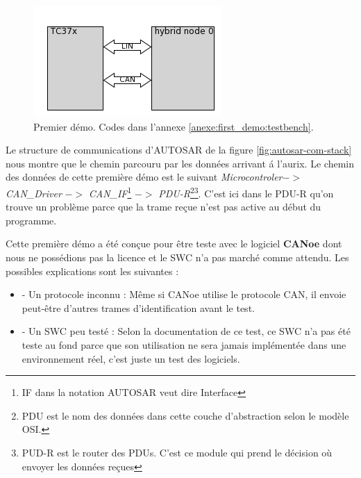 \begin{figure}[!htb] 
\centering 
\includegraphics[]{img/first_demo_testbench.png} 
\caption{Premier démo. Codes dans l'annexe \ref{anexe:first_demo:testbench}.} 
\label{fig:first-demo-diagram} 
\end{figure} 

Le structure de communications d'AUTOSAR de la figure \ref{fig:autosar-com-stack} nous montre que le chemin parcouru par les données arrivant \'a l'aurix. Le chemin des données de cette première démo est le suivant \textit{Microcontroler}$ ->$ \textit{CAN\_Driver}\cite{can_drv_man} $->$ \textit{CAN\_IF}\footnote{IF dans la notation AUTOSAR veut dire Interface}\cite{can_if_man} $->$ \textit{PDU-R}\footnote{PDU est le nom des donn\'ees dans cette couche d'abstraction selon le modèle OSI\cite{osi-model}.}\footnote{PUD-R\cite{pdu_r_man} est le router des PDUs. C'est ce module qui prend le décision o\`u envoyer les données reçues}\cite{pdu_r_man}. C'est ici dans le PDU-R qu'on trouve un problème parce que la trame reçue n'est pas active au début du programme. 

Cette première démo a été conçue pour être teste avec le logiciel \textbf{CANoe}\cite{canoe} dont nous ne possédions pas la licence et le SWC n'a pas marché comme attendu. Les possibles explications sont les suivantes : 

\begin{itemize} 
    \item - Un protocole inconnu : Même si CANoe utilise le protocole CAN, il envoie peut-être d'autres trames d'identification avant le test. 
    \item - Un SWC peu test\'e : Selon la documentation de ce test, ce SWC n'a pas \'et\'e teste au fond parce que son utilisation ne sera jamais implémentée dans une environnement réel, c'est juste un test des logiciels. 

\end{itemize} 

